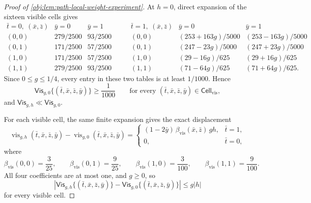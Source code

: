 \begin{proof}[Proof of \cref{obj:lem:path-local-weight-experiment}]
At \(h=0\), direct expansion of the sixteen visible cells gives
\[
\begin{array}{c|cc}
\bar t=0,\;(\bar x,\bar z) & \bar y=0 & \bar y=1\\ \hline
(0,0) & 279/2500 & 93/2500\\
(0,1) & 171/2500 & 57/2500\\
(1,0) & 171/2500 & 57/2500\\
(1,1) & 279/2500 & 93/2500
\end{array}
\qquad
\begin{array}{c|cc}
\bar t=1,\;(\bar x,\bar z) & \bar y=0 & \bar y=1\\ \hline
(0,0) & (253+163g)/5000 & (253-163g)/5000\\
(0,1) & (247-23g)/5000 & (247+23g)/5000\\
(1,0) & (29-16g)/625 & (29+16g)/625\\
(1,1) & (71-64g)/625 & (71+64g)/625 .
\end{array}
\]
Since \(0\le g\le 1/4\), every entry in these two tables is at least \(1/1000\).  Hence
\[
\mathsf{Vis}_{g,0}\{(\bar t,\bar x,\bar z,\bar y)\}\ge \frac1{1000}
\qquad
\text{for every }(\bar t,\bar x,\bar z,\bar y)\in\mathsf{Cell}_{\mathrm{vis}},
\]
and \(\mathsf{Vis}_{g,h}\ll\mathsf{Vis}_{g,0}\). %

For each visible cell, the same finite expansion gives the exact displacement
\[
\operatorname{vis}_{g,h}(\bar t,\bar x,\bar z,\bar y)
-
\operatorname{vis}_{g,0}(\bar t,\bar x,\bar z,\bar y)
=
\begin{cases}
(1-2\bar y)\,\beta_{\mathrm{vis}}(\bar x,\bar z)\,g h,
& \bar t=1,\\
0,& \bar t=0,
\end{cases}
\]
where
\[
\beta_{\mathrm{vis}}(0,0)=\frac3{25},\qquad
\beta_{\mathrm{vis}}(0,1)=\frac9{25},\qquad
\beta_{\mathrm{vis}}(1,0)=\frac3{100},\qquad
\beta_{\mathrm{vis}}(1,1)=\frac9{100}.
\]
All four coefficients are at most one, and \(g\ge0\), so
\[
\left|
\mathsf{Vis}_{g,h}\{(\bar t,\bar x,\bar z,\bar y)\}
-
\mathsf{Vis}_{g,0}\{(\bar t,\bar x,\bar z,\bar y)\}
\right|
\le g|h|
\]
for every visible cell. %


\end{proof}
